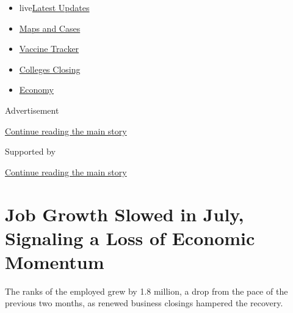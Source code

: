 \begin{itemize}
\tightlist
\item
  live\href{https://www.nytimes3xbfgragh.onion/2020/08/21/world/covid-19-coronavirus.html?name=styln-coronavirus-markets\&region=TOP_BANNER\&variant=undefined\&block=storyline_menu_recirc\&action=click\&pgtype=Article\&impression_id=a4f50c10-e3b5-11ea-82f7-af6d488d7008}{Latest
  Updates}
\item
  \href{https://www.nytimes3xbfgragh.onion/interactive/2020/us/coronavirus-us-cases.html?name=styln-coronavirus-markets\&region=TOP_BANNER\&variant=undefined\&block=storyline_menu_recirc\&action=click\&pgtype=Article\&impression_id=a4f50c11-e3b5-11ea-82f7-af6d488d7008}{Maps
  and Cases}
\item
  \href{https://www.nytimes3xbfgragh.onion/interactive/2020/science/coronavirus-vaccine-tracker.html?name=styln-coronavirus-markets\&region=TOP_BANNER\&variant=undefined\&block=storyline_menu_recirc\&action=click\&pgtype=Article\&impression_id=a4f50c12-e3b5-11ea-82f7-af6d488d7008}{Vaccine
  Tracker}
\item
  \href{https://www.nytimes3xbfgragh.onion/2020/08/19/us/colleges-closing-covid.html?name=styln-coronavirus-markets\&region=TOP_BANNER\&variant=undefined\&block=storyline_menu_recirc\&action=click\&pgtype=Article\&impression_id=a4f50c13-e3b5-11ea-82f7-af6d488d7008}{Colleges
  Closing}
\item
  \href{https://www.nytimes3xbfgragh.onion/live/2020/08/21/business/stock-market-today-coronavirus?name=styln-coronavirus-markets\&region=TOP_BANNER\&variant=undefined\&block=storyline_menu_recirc\&action=click\&pgtype=Article\&impression_id=a4f50c14-e3b5-11ea-82f7-af6d488d7008}{Economy}
\end{itemize}

Advertisement

\protect\hyperlink{after-top}{Continue reading the main story}

Supported by

\protect\hyperlink{after-sponsor}{Continue reading the main story}

\hypertarget{job-growth-slowed-in-july-signaling-a-loss-of-economic-momentum}{%
\section{Job Growth Slowed in July, Signaling a Loss of Economic
Momentum}\label{job-growth-slowed-in-july-signaling-a-loss-of-economic-momentum}}

The ranks of the employed grew by 1.8 million, a drop from the pace of
the previous two months, as renewed business closings hampered the
recovery.

